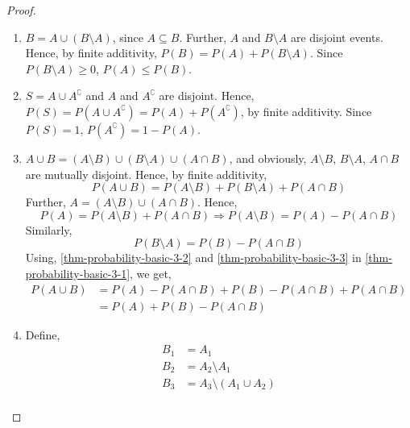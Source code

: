 \begin{proof}$\quad$                                                         \\
\begin{enumerate}[noitemsep,topsep=0pt]
\item
    $B = A \cup (B \setminus A)$, since $A \subseteq B$. Further, $A$ and
    $B \setminus A$ are disjoint events. Hence, by finite additivity, $P(B) =
    P(A) + P(B \setminus A)$. Since $P(B \setminus A) \geq 0$, $P(A) \leq
    P(B)$.
\item
    $S = A \cup A^\complement$ and $A$ and $A^\complement$ are disjoint. Hence,
    $P(S) = P(A \cup A^\complement) = P(A) + P(A^\complement)$, by finite
    additivity. Since $P(S) = 1$, $P(A^\complement) = 1 - P(A)$.
\item
    $A \cup B = (A \setminus B) \cup (B \setminus A) \cup (A \cap B)$, and
    obviously, $A \setminus B$, $B \setminus A$, $A \cap B$ are mutually
    disjoint. Hence, by finite additivity,
    \begin{equation}
        \label{thm-probability-basic-3-1}
        P(A \cup B) = P(A \setminus B) + P(B \setminus A) + P(A \cap B)
    \end{equation}
    Further, $A = (A \setminus B) \cup (A \cap B)$. Hence,
    \begin{equation}
        \label{thm-probability-basic-3-2}
        P(A) = P(A \setminus B) + P(A \cap B)
        \Rightarrow
        P(A \setminus B) = P(A) - P(A \cap B)
    \end{equation}
    Similarly,
    \begin{equation}
        \label{thm-probability-basic-3-3}
        P(B \setminus A) = P(B) - P(A \cap B)
    \end{equation}
    Using, \ref{thm-probability-basic-3-2} and \ref{thm-probability-basic-3-3}
    in \ref{thm-probability-basic-3-1}, we get,
    \begin{align*}
        P(A \cup B) &= P(A) - P(A \cap B) + P(B) - P(A \cap B) + P(A \cap B) \\
                    &= P(A) + P(B) - P(A \cap B)
    \end{align*}
\item
    Define,
    \begin{align*}
        B_1 &= A_1                                                           \\
        B_2 &= A_2 \setminus A_1                                             \\
        B_3 &= A_3 \setminus (A_1 \cup A_2)                                  \\

\end{align*}
\end{enumerate}
\end{proof}
